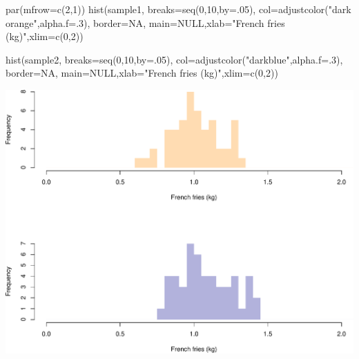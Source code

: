 \documentclass[
]{book}
\newenvironment{Shaded}{\begin{snugshade}}{\end{snugshade}}
\newcommand{\AttributeTok}[1]{\textcolor[rgb]{0.77,0.63,0.00}{#1}}
\newcommand{\ConstantTok}[1]{\textcolor[rgb]{0.00,0.00,0.00}{#1}}
\newcommand{\DecValTok}[1]{\textcolor[rgb]{0.00,0.00,0.81}{#1}}
\newcommand{\FunctionTok}[1]{\textcolor[rgb]{0.00,0.00,0.00}{#1}}
\newcommand{\NormalTok}[1]{#1}
\newcommand{\StringTok}[1]{\textcolor[rgb]{0.31,0.60,0.02}{#1}}
\begin{document}
\begin{Shaded}
\begin{Highlighting}[]
\FunctionTok{par}\NormalTok{(}\AttributeTok{mfrow=}\FunctionTok{c}\NormalTok{(}\DecValTok{2}\NormalTok{,}\DecValTok{1}\NormalTok{))}
\FunctionTok{hist}\NormalTok{(sample1,}
     \AttributeTok{breaks=}\FunctionTok{seq}\NormalTok{(}\DecValTok{0}\NormalTok{,}\DecValTok{10}\NormalTok{,}\AttributeTok{by=}\NormalTok{.}\DecValTok{05}\NormalTok{),}
     \AttributeTok{col=}\FunctionTok{adjustcolor}\NormalTok{(}\StringTok{"dark orange"}\NormalTok{,}\AttributeTok{alpha.f=}\NormalTok{.}\DecValTok{3}\NormalTok{),}
     \AttributeTok{border=}\ConstantTok{NA}\NormalTok{,}
     \AttributeTok{main=}\ConstantTok{NULL}\NormalTok{,}\AttributeTok{xlab=}\StringTok{"French fries (kg)"}\NormalTok{,}\AttributeTok{xlim=}\FunctionTok{c}\NormalTok{(}\DecValTok{0}\NormalTok{,}\DecValTok{2}\NormalTok{))}

\FunctionTok{hist}\NormalTok{(sample2,}
     \AttributeTok{breaks=}\FunctionTok{seq}\NormalTok{(}\DecValTok{0}\NormalTok{,}\DecValTok{10}\NormalTok{,}\AttributeTok{by=}\NormalTok{.}\DecValTok{05}\NormalTok{),}
     \AttributeTok{col=}\FunctionTok{adjustcolor}\NormalTok{(}\StringTok{"darkblue"}\NormalTok{,}\AttributeTok{alpha.f=}\NormalTok{.}\DecValTok{3}\NormalTok{),}
     \AttributeTok{border=}\ConstantTok{NA}\NormalTok{,}
     \AttributeTok{main=}\ConstantTok{NULL}\NormalTok{,}\AttributeTok{xlab=}\StringTok{"French fries (kg)"}\NormalTok{,}\AttributeTok{xlim=}\FunctionTok{c}\NormalTok{(}\DecValTok{0}\NormalTok{,}\DecValTok{2}\NormalTok{))}
\end{Highlighting}
\end{Shaded}

\includegraphics{figures/unnamed-chunk-227-1.pdf}
\end{document}
